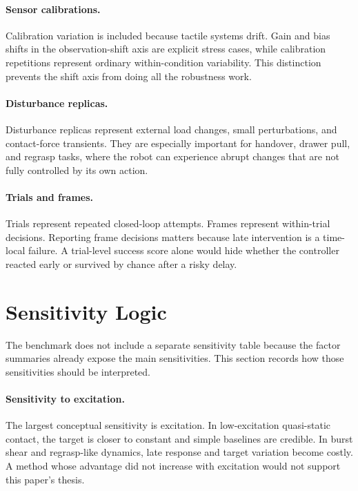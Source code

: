 \documentclass{article}
\begin{document}
\paragraph{Sensor calibrations.}
Calibration variation is included because tactile systems drift. Gain and bias shifts in the observation-shift axis are explicit stress cases, while calibration repetitions represent ordinary within-condition variability. This distinction prevents the shift axis from doing all the robustness work.

\paragraph{Disturbance replicas.}
Disturbance replicas represent external load changes, small perturbations, and contact-force transients. They are especially important for handover, drawer pull, and regrasp tasks, where the robot can experience abrupt changes that are not fully controlled by its own action.

\paragraph{Trials and frames.}
Trials represent repeated closed-loop attempts. Frames represent within-trial decisions. Reporting frame decisions matters because late intervention is a time-local failure. A trial-level success score alone would hide whether the controller reacted early or survived by chance after a risky delay.

\section{Sensitivity Logic}

The benchmark does not include a separate sensitivity table because the factor summaries already expose the main sensitivities. This section records how those sensitivities should be interpreted.

\paragraph{Sensitivity to excitation.}
The largest conceptual sensitivity is excitation. In low-excitation quasi-static contact, the target is closer to constant and simple baselines are credible. In burst shear and regrasp-like dynamics, late response and target variation become costly. A method whose advantage did not increase with excitation would not support this paper's thesis.
\end{document}

